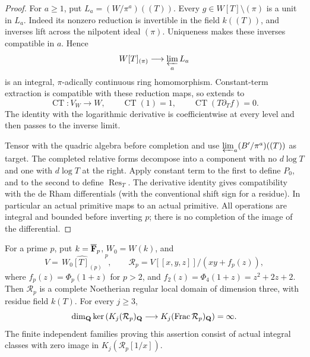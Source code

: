 \begin{proof}
For $a\geq1$, put $L_a=(W/\pi^a)((T))$.
Every $g\in W[T]\setminus(\pi)$ is a unit in $L_a$.
Indeed its nonzero reduction is invertible in the field
$k((T))$, and inverses lift across the nilpotent ideal $(\pi)$.
Uniqueness makes these inverses compatible in $a$. Hence
\[
 W[T]_{(\pi)}\longrightarrow\varprojlim_a L_a
\]
is an integral, $\pi$-adically continuous ring homomorphism.
Constant-term extraction is compatible with these reduction maps,
so extends to
\[
 \operatorname{CT}:V_W\longrightarrow W,\qquad
 \operatorname{CT}(1)=1,\qquad
 \operatorname{CT}(T\partial_T f)=0.
\]
The identity with the logarithmic derivative is coefficientwise
at every level and then passes to the inverse limit.

Tensor with the quadric algebra before completion and use
$\varprojlim_a(B'/\pi^a)((T))$ as target.  The completed relative
forms decompose into a component with no $d\log T$ and one
with $d\log T$ at the right. Apply constant term to the first
to define $P_0$, and to the second to define
$\operatorname{Res}_T$.
The derivative identity gives compatibility with the de Rham
differentials (with the conventional shift sign for a residue).
In particular an actual primitive maps to an actual primitive.
All operations are integral and bounded before inverting $p$;
there is no completion of the image of the differential.
\end{proof}

\begin{theorem}
\label{d3:thm:completedfixedalldegree}
For a prime $p$, put $k=\overline{\mathbf F}_p$, $W_0=W(k)$, and
\[
 V=\widehat{\,W_0[T]_{(p)}\,}^{\,p},\qquad
 \mathcal R_p=V[[x,y,z]]/(xy+f_p(z)),
\]
where $f_p(z)=\Phi_p(1+z)$ for $p>2$, and
$f_2(z)=\Phi_4(1+z)=z^2+2z+2$.
Then $\mathcal R_p$ is a complete Noetherian regular local
domain of dimension three, with residue field $k(T)$.
For every $j\geq3$,
\[
 \dim_{\mathbf Q}\ker\left(K_j(\mathcal R_p)_{\mathbf Q}
          \longrightarrow K_j(\operatorname{Frac}\mathcal R_p)_{\mathbf Q}\right)
 =\infty.
\]
The finite independent families proving this assertion consist
of actual integral classes with zero image in
$K_j(\mathcal R_p[1/x])$.
\end{theorem}

